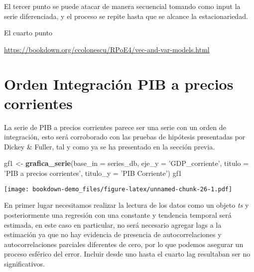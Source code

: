 \documentclass[]{book}
\newenvironment{Shaded}{\begin{snugshade}}{\end{snugshade}}
\newcommand{\KeywordTok}[1]{\textcolor[rgb]{0.13,0.29,0.53}{\textbf{#1}}}
\newcommand{\DataTypeTok}[1]{\textcolor[rgb]{0.13,0.29,0.53}{#1}}
\newcommand{\DecValTok}[1]{\textcolor[rgb]{0.00,0.00,0.81}{#1}}
\newcommand{\StringTok}[1]{\textcolor[rgb]{0.31,0.60,0.02}{#1}}
\newcommand{\OperatorTok}[1]{\textcolor[rgb]{0.81,0.36,0.00}{\textbf{#1}}}
\newcommand{\NormalTok}[1]{#1}
\theoremstyle{definition}
\theoremstyle{definition}
\theoremstyle{definition}
\theoremstyle{remark}
\begin{document}
El tercer punto se puede atacar de manera secuencial tomando como input
la serie diferenciada, y el proceso se repite hasta que se alcance la
estacionariedad.

El cuarto punto

\url{https://bookdown.org/ccolonescu/RPoE4/vec-and-var-models.html}

\chapter{Orden Integración PIB a precios
corrientes}\label{orden-integracion-pib-a-precios-corrientes}

La serie de PIB a precios corrientes parece ser una serie con un orden
de integración, esto será corroborado con las pruebas de hipótesis
presentadas por Dickey \& Fuller, tal y como ya se ha presentado en la
sección previa.

\begin{Shaded}
\begin{Highlighting}[]
\NormalTok{gf1 <-}\StringTok{ }\KeywordTok{grafica_serie}\NormalTok{(}\DataTypeTok{base_in =}\NormalTok{ series_db, }
                      \DataTypeTok{eje_y =} \StringTok{'GDP_corriente'}\NormalTok{, }
                      \DataTypeTok{titulo =} \StringTok{'PIB a precios corrientes'}\NormalTok{, }
                      \DataTypeTok{titulo_y =} \StringTok{'PIB Corriente'}\NormalTok{)}
\NormalTok{gf1}
\end{Highlighting}
\end{Shaded}

\texttt{[image: bookdown-demo\_files/figure-latex/unnamed-chunk-26-1.pdf]}

En primer lugar necesitamos realizar la lectura de los datos como un
objeto \emph{ts} y posteriormente una regresión con una constante y
tendencia temporal será estimada, en este caso en particular, no será
necesario agregar lags a la estimación ya que no hay evidencia de
presencia de autocorrelaciones y autocorrelaciones parciales diferentes
de cero, por lo que podemos asegurar un proceso esférico del error.
Incluir desde uno hasta el cuarto lag resultaban ser no significativos.

\begin{Shaded}
\end{Shaded}
\end{document}

